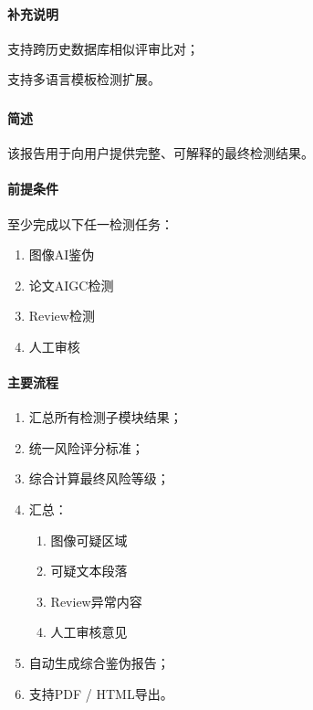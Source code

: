 \paragraph*{补充说明}

支持跨历史数据库相似评审比对；

支持多语言模板检测扩展。

\subsubsection{}\paragraph*{简述}


该报告用于向用户提供完整、可解释的最终检测结果。

\paragraph*{前提条件}

至少完成以下任一检测任务：

\begin{enumerate}
    \item 图像AI鉴伪
    \item 论文AIGC检测
    \item Review检测
    \item 人工审核
\end{enumerate}

\paragraph*{主要流程}

\begin{enumerate}
    \item 汇总所有检测子模块结果；
    \item 统一风险评分标准；
    \item 综合计算最终风险等级；
    \item 汇总：
    \begin{enumerate}
        \item 图像可疑区域
        \item 可疑文本段落
        \item Review异常内容
        \item 人工审核意见
    \end{enumerate}
    \item 自动生成综合鉴伪报告；
    \item 支持PDF / HTML导出。
\end{enumerate}

